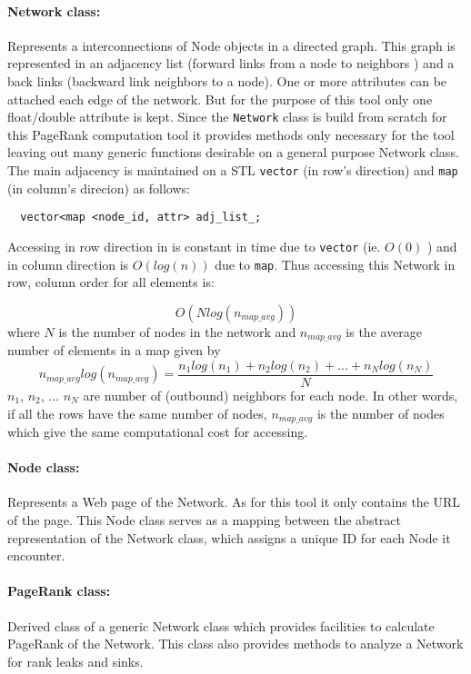 \documentclass[10pt]{article}
\begin{document}
\paragraph{Network class:} 
Represents a interconnections of Node objects in a directed
graph. This graph is represented in an adjacency list
(forward links from a node to neighbors ) and a back links 
(backward link neighbors to a node). One or more attributes can be attached 
each edge of the network. But for the purpose of this tool only one float/double
attribute is kept.
Since the \texttt{Network} class is build from scratch for this PageRank computation 
tool it provides methods only necessary for the tool leaving out many generic functions 
desirable on a general purpose Network class.
The main adjacency is maintained on a STL \texttt{vector} (in row's direction) and  \texttt{map} 
(in column's direcion) as follows:
\begin{verbatim}
  vector<map <node_id, attr> adj_list_; 
\end{verbatim}
Accessing in row direction in is constant in time due to \texttt{vector} (ie. $O(0)$ ) and in
column direction is $O(log (n))$ due to \texttt{map}. 
Thus accessing this Network in row, column order for all elements is:

\begin{equation}
O(N log(n_{map\_avg}))
\end{equation}
where $N$ is the number of nodes in the network and $n_{map\_avg}$ is the average number 
of elements in a map given by
\begin{equation}
n_{map\_avg}log(n_{map\_avg}) = \frac{n_1log(n_{1})+ n_2log(n_{2}) + ... + n_Nlog(n_{N})}{N}
\end{equation}
$n_1$, $n_2$, ... $n_N$ are number of (outbound) neighbors for each node. In other words, 
if all the rows have the same number of nodes, $n_{map\_avg}$ is the number of nodes which
give the same computational cost for accessing.

\paragraph{Node class:} 
Represents a Web page of the Network. As for this tool it
only contains the URL of the page. This Node class serves as a mapping between
the abstract representation of the Network class, which assigns a unique
ID for each Node it encounter.

\paragraph{PageRank class:} 
Derived class of a generic Network class which provides 
facilities to calculate PageRank of the Network. This class also provides
methods to analyze a Network for rank leaks and sinks.
\end{document}
